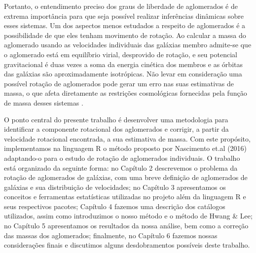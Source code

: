 Portanto, o entendimento preciso dos graus de liberdade de aglomerados é de extrema importância para que seja possível realizar inferências dinâmicas sobre esses sistemas. Um dos aspectos menos estudados a respeito de aglomerados é a possibilidade de que eles tenham movimento de rotação. Ao calcular a massa do aglomerado usando as velocidades individuais das galáxias membro admite-se que o aglomerado está em equilíbrio virial, desprovido de rotação, e seu potencial gravitacional é duas vezes a soma da energia cinética dos membros e as órbitas das galáxias são aproximadamente isotrópicas. Não levar em consideração uma possível rotação de aglomerados pode gerar um erro nas suas estimativas de massa, o que afeta diretamente as restrições cosmológicas fornecidas pela função de massa desses sistemas \cite{fang2009rotation}.

O ponto central do presente trabalho é desenvolver uma metodologia para identificar a componente rotacional dos aglomerados e corrigir, a partir da velocidade rotacional encontrada, a sua estimativa de massa. Com este propósito, implementamos na linguagem R o método proposto por Nascimento et.al (2016) adaptando-o para o estudo de rotação de aglomerados individuais. O trabalho está organizado da seguinte forma: no Capítulo 2 descrevemos o problema da rotação de aglomerados de galáxias, com uma breve definição de aglomerados de galáxias e sua distribuição de velocidades; no Capítulo 3 apresentamos os conceitos e ferramentas estatísticas utilizadas no projeto além da linguagem R e seus respectivos pacotes; Capítulo 4 fazemos uma descrição dos catálogos utilizados, assim como introduzimos o nosso método e o método de Hwang \& Lee; no Capítulo 5 apresentamos os resultados da nossa análise, bem como a correção das massas dos aglomerados; finalmente, no Capítulo 6 fazemos nossas considerações finais e discutimos alguns desdobramentos possíveis deste trabalho.     

